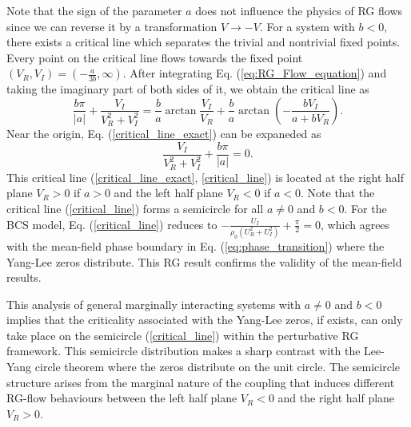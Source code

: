 \documentclass[aps,prl,twocolumn,nofootinbib,superscriptaddress,longbibliography]{revtex4-1}
\begin{document}
	 Note that the sign of the parameter $a$ does not influence the physics of RG flows since we can reverse it by a transformation $V\to-V$. For a system with $b<0$, there exists a critical line which separates the trivial and nontrivial fixed points. Every point on the critical line flows towards the fixed point $(V_R, V_I) = (-\frac{a}{3b}, \infty)$. %
	 After integrating Eq. (\ref{eq:RG_Flow_equation}) and taking the imaginary part of both sides of it, we obtain the critical line as
	\begin{equation}
		\frac{b\pi}{|a|}+\frac{V_I}{V_R^2+V_I^2}=\frac{b}{a}\arctan{\frac{V_I}{V_R}}+\frac{b}{a}\arctan{(-\frac{b V_I}{a+b V_R})}.
		\label{critical_line_exact}
	\end{equation}
	Near the origin, Eq. (\ref{critical_line_exact}) can be expaneded as
	\begin{equation}
		\frac{V_I}{V_R^2+V_I^2}+\frac{b\pi}{|a|}=0.
		\label{critical_line}
	\end{equation}
	This critical line (\ref{critical_line_exact}, \ref{critical_line}) is located at the right half plane $V_R>0$ if $a>0$ and the left half plane $V_R<0$ if $a<0$. Note that the critical line (\ref{critical_line}) forms a semicircle for all $a\neq0$ and $b<0$. For the BCS model, Eq. (\ref{critical_line}) reduces to $-\frac{U_I}{\rho_0(U_R^2+U_I^2)}+\frac{\pi}{2}=0$, which agrees with the mean-field phase boundary in Eq. (\ref{eq:phase_transition}) where the Yang-Lee zeros distribute. This RG result confirms the validity of the mean-field results. %
	
	
	This analysis of general marginally interacting systems with $a \neq 0$ and $b < 0$ implies that the criticality associated with the Yang-Lee zeros, if exists, can only take place on the semicircle (\ref{critical_line}) within the perturbative RG framework. %
	This semicircle distribution makes a sharp contrast with the Lee-Yang circle theorem \cite{PhysRev.87.410} where the zeros distribute on the unit circle. The semicircle structure arises from the marginal nature of the coupling that induces different RG-flow behaviours between the left half plane $V_R<0$ and the right half plane $V_R>0$. 
	
\end{document}
